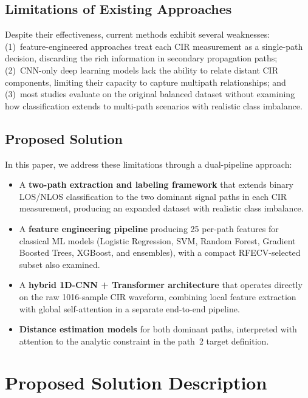 \documentclass[conference]{IEEEtran}
\begin{document}
\subsection{Limitations of Existing Approaches}

Despite their effectiveness, current methods exhibit several weaknesses: (1)~feature-engineered approaches treat each CIR measurement as a single-path decision, discarding the rich information in secondary propagation paths; (2)~CNN-only deep learning models lack the ability to relate distant CIR components, limiting their capacity to capture multipath relationships; and (3)~most studies evaluate on the original balanced dataset without examining how classification extends to multi-path scenarios with realistic class imbalance.

\subsection{Proposed Solution}

In this paper, we address these limitations through a dual-pipeline approach:
\begin{itemize}
    \item A \textbf{two-path extraction and labeling framework} that extends binary LOS/NLOS classification to the two dominant signal paths in each CIR measurement, producing an expanded dataset with realistic class imbalance.
    \item A \textbf{feature engineering pipeline} producing 25 per-path features for classical ML models (Logistic Regression, SVM, Random Forest, Gradient Boosted Trees, XGBoost, and ensembles), with a compact RFECV-selected subset also examined.
    \item A \textbf{hybrid 1D-CNN + Transformer architecture} that operates directly on the raw 1016-sample CIR waveform, combining local feature extraction with global self-attention in a separate end-to-end pipeline.
    \item \textbf{Distance estimation models} for both dominant paths, interpreted with attention to the analytic constraint in the path~2 target definition.
\end{itemize}

\section{Proposed Solution Description}
\end{document}
